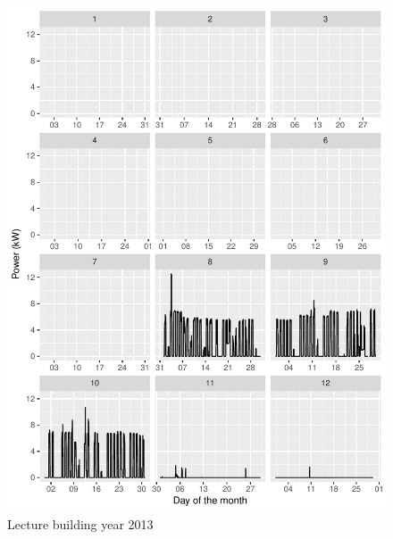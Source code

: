 \documentclass[11pt, oneside]{article}   	%
\begin{document}
\begin{figure}
\includegraphics[keepaspectratio]{lecture_build_Y2013.pdf}
\caption{Lecture building year 2013 }
\end{figure}
\end{document}
